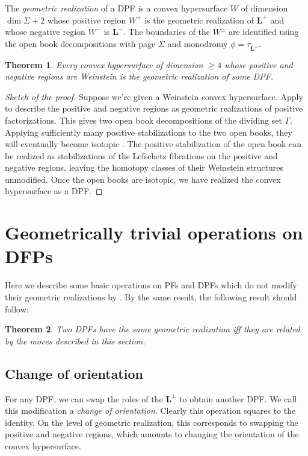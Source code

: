 \documentclass[11pt]{amsart}
\newcommand{\thicc}[1]{\pmb{#1}}
\newcommand{\LagTuple}{\thicc{L}}
\newtheorem{thm}{Theorem}[section]
\begin{document}
The \emph{geometric realization} of a DPF is a convex hypersurface $W$ of dimension $\dim \Sigma + 2$ whose positive region $W^{+}$ is the geometric realization of $\LagTuple^{+}$ and whose negative region $W^{-}$ is $\LagTuple^{-}$. The boundaries of the $W^{\pm}$ are identified using the open book decompositions with page $\Sigma$ and monodromy $\phi = \tau_{\LagTuple^{\pm}}$.

\begin{thm}
Every convex hypersurface of dimension $\geq 4$ whose positive and negative regions are Weinstein is the geometric realization of some DPF.
\end{thm}

\begin{proof}[Sketch of the proof]
Suppose we're given a Weinstein convex hypersurface. Apply \cite{BHH:GirouxCorrespondence, GirouxPardon} to describe the positive and negative regions as geometric realizations of positive factorizations. This gives two open book decompositions of the dividing set $\Gamma$. Applying sufficiently many positive stabilizations to the two open books, they will eventually become isotopic \cite{BHH:GirouxCorrespondence}. The positive stabilization of the open book can be realized as stabilizations of the Lefschetz fibrations on the positive and negative regions, leaving the homotopy classes of their Weinstein structures unmodified. Once the open books are isotopic, we have realized the convex hypersurface as a DPF.
\end{proof}

\section{Geometrically trivial operations on DFPs}

Here we describe some basic operations on PFs and DPFs which do not modify their geometric realizations by \cite[Corollary 1.3.3]{BHH:GirouxCorrespondence}. By the same result, the following result should follow:

\begin{thm}
Two DPFs have the same geometric realization iff they are related by the moves described in this section.
\end{thm}

\subsection{Change of orientation}

For any DPF, we can swap the roles of the $\LagTuple^{\pm}$ to obtain another DPF. We call this modification a \emph{change of orientation}. Clearly this operation squares to the identity. On the level of geometric realization, this corresponds to swapping the positive and negative regions, which amounts to changing the orientation of the convex hypersurface.
\end{document}
